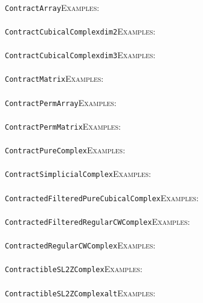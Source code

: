 \documentclass[a4paper,11pt]{report}
\begin{document}
{{ \\
 \texttt{ContractArray}{\nobreakspace}{\nobreakspace}{\nobreakspace}{\nobreakspace}\textsc{Examples:} \\
 \\
 \texttt{ContractCubicalComplex{\textunderscore}dim2}{\nobreakspace}{\nobreakspace}{\nobreakspace}{\nobreakspace}\textsc{Examples:} \\
 \\
 \texttt{ContractCubicalComplex{\textunderscore}dim3}{\nobreakspace}{\nobreakspace}{\nobreakspace}{\nobreakspace}\textsc{Examples:} \\
 \\
 \texttt{ContractMatrix}{\nobreakspace}{\nobreakspace}{\nobreakspace}{\nobreakspace}\textsc{Examples:} \\
 \\
 \texttt{ContractPermArray}{\nobreakspace}{\nobreakspace}{\nobreakspace}{\nobreakspace}\textsc{Examples:} \\
 \\
 \texttt{ContractPermMatrix}{\nobreakspace}{\nobreakspace}{\nobreakspace}{\nobreakspace}\textsc{Examples:} \\
 \\
 \texttt{ContractPureComplex}{\nobreakspace}{\nobreakspace}{\nobreakspace}{\nobreakspace}\textsc{Examples:} \\
 \\
 \texttt{ContractSimplicialComplex}{\nobreakspace}{\nobreakspace}{\nobreakspace}{\nobreakspace}\textsc{Examples:} \\
 \\
 \texttt{ContractedFilteredPureCubicalComplex}{\nobreakspace}{\nobreakspace}{\nobreakspace}{\nobreakspace}\textsc{Examples:} \\
 \\
 \texttt{ContractedFilteredRegularCWComplex}{\nobreakspace}{\nobreakspace}{\nobreakspace}{\nobreakspace}\textsc{Examples:} \\
 \\
 \texttt{ContractedRegularCWComplex}{\nobreakspace}{\nobreakspace}{\nobreakspace}{\nobreakspace}\textsc{Examples:} \\
 \\
 \texttt{ContractibleSL2ZComplex}{\nobreakspace}{\nobreakspace}{\nobreakspace}{\nobreakspace}\textsc{Examples:} \\
 \\
 \texttt{ContractibleSL2ZComplex{\textunderscore}alt}{\nobreakspace}{\nobreakspace}{\nobreakspace}{\nobreakspace}\textsc{Examples:} \\
}}
\end{document}
